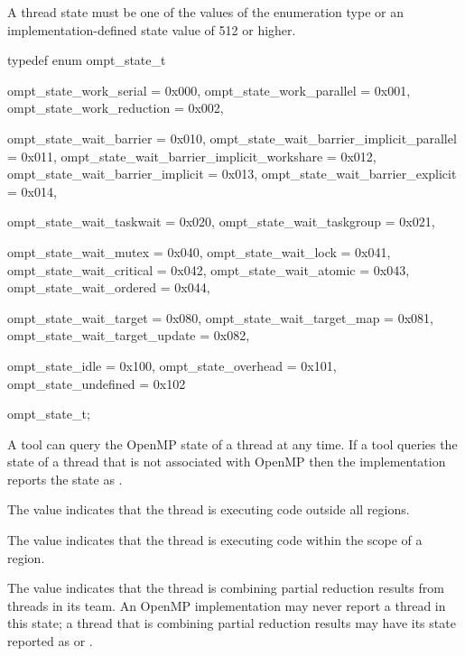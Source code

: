 \format
\begin{ccppspecific}
A thread state must be one of the values of the enumeration type 
 or an implementation-defined state value of 512 or higher.

\begin{ompcEnum}
typedef enum ompt_state_t {
  ompt_state_work_serial                      = 0x000,
  ompt_state_work_parallel                    = 0x001,
  ompt_state_work_reduction                   = 0x002,

  ompt_state_wait_barrier                     = 0x010,
  ompt_state_wait_barrier_implicit_parallel   = 0x011,
  ompt_state_wait_barrier_implicit_workshare  = 0x012,
  ompt_state_wait_barrier_implicit            = 0x013,
  ompt_state_wait_barrier_explicit            = 0x014,

  ompt_state_wait_taskwait                    = 0x020,
  ompt_state_wait_taskgroup                   = 0x021,

  ompt_state_wait_mutex                       = 0x040,
  ompt_state_wait_lock                        = 0x041,
  ompt_state_wait_critical                    = 0x042,
  ompt_state_wait_atomic                      = 0x043,
  ompt_state_wait_ordered                     = 0x044,

  ompt_state_wait_target                      = 0x080,
  ompt_state_wait_target_map                  = 0x081,
  ompt_state_wait_target_update               = 0x082,

  ompt_state_idle                             = 0x100,
  ompt_state_overhead                         = 0x101,
  ompt_state_undefined                        = 0x102
} ompt_state_t;
\end{ompcEnum}
\end{ccppspecific}

\descr
A tool can query the OpenMP state of a thread at any time. If a 
tool queries the state of a thread that is not associated with OpenMP
then the implementation reports the state as .

The value  indicates that the thread 
is executing code outside all  regions.

The value  indicates that the thread 
is executing code within the scope of a  region.

The value  indicates that the thread 
is combining partial reduction results from threads in its team. An 
OpenMP implementation may never report a thread in this state; a 
thread that is combining partial reduction results may have its state 
reported as  or .

